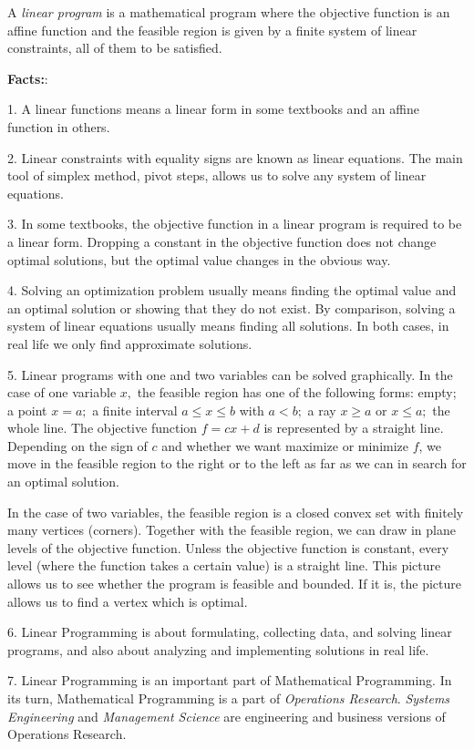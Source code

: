 A {\it linear program } is  a mathematical program  where the objective function is an affine function and the feasible region is given by a finite system of linear constraints, all of them to be satisfied.  

{\bf Facts:}:

1. A linear functions means a linear form in some textbooks and an affine function in others.

2. Linear constraints with equality signs are known as linear equations.
The main tool of simplex method, pivot steps, allows us to solve any system of linear equations.

3. In some textbooks, the objective function in a linear program is required to be a linear form.  Dropping a constant in the objective function does not change optimal solutions, but the optimal value  changes in the obvious way.

4. Solving an optimization problem  usually means  finding the optimal value and an optimal solution or showing that they do not exist. By comparison,
solving a   system of linear equations usually means finding all solutions.
In both cases, in real life we only find approximate solutions.

5. Linear programs with one and two variables can be solved graphically.
In the case of one variable $x,$  the feasible region has one   of the following
forms: empty; a point $x=a;$  a finite interval $a \le x \le b$ with $a < b;$
a ray  $x \ge a$ or $x \le a;$ the whole line.
The objective function  $f = cx+d$ is represented by a straight line.
Depending  on the sign of $c$ and whether we want maximize or minimize $f$,
we move in the feasible region to the right or to the left as far as we can in search for an optimal solution.

In the case of two variables, the feasible region is a closed convex set with
finitely many vertices (corners).  Together with the feasible region, we can draw in plane levels of the objective function.
Unless the objective function is constant, every level  (where the function takes a certain value) is a straight line. This picture allows us
to see whether the program is feasible and bounded. If it is, the picture allows us to find a vertex which is  optimal. 


6. Linear Programming is about formulating, collecting data, and solving linear programs, and also about analyzing and implementing  solutions in real life.

7. Linear Programming is an important  part of Mathematical Programming.
In its turn, Mathematical Programming is a part of {\it Operations Research}.  
{\it Systems Engineering} and  {\it Management Science} are engineering 
and business versions of  Operations Research.


